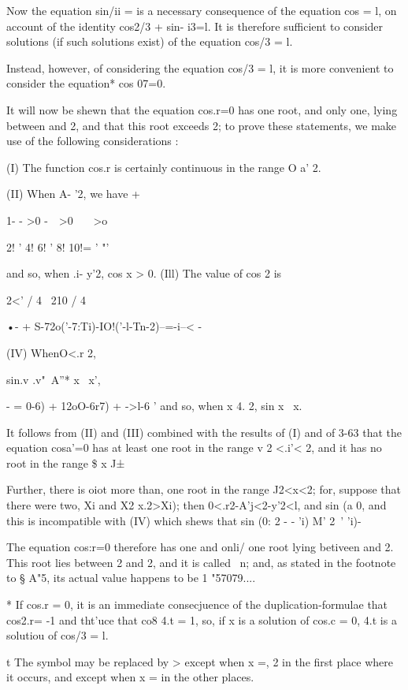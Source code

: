 Now the equation sin/ii = is a necessary consequence of the equation
cos = l, on account of the identity cos2/3 + sin- i3=l. It is
therefore sufficient to consider solutions (if such solutions exist)
of the equation cos/3 = l.

Instead, however, of considering the equation cos/3 = l, it is more
convenient to consider the equation* cos 07=0.

It will now be shewn that the equation cos.r=0 has one root, and only
one, lying between and 2, and that this root exceeds 2; to prove
these statements, we make use of the following considerations :

(I) The function cos.r is certainly continuous in the range O a' 2.

(II) When A- '2, we have +

1- - >0 -\ \ >0 \ \ \ >o

2! ' 4! 6! ' 8! 10!= ' "'

and so, when .i- y'2, cos x > 0. (Ill) The value of cos 2 is

2<' / 4 \ 210 / 4 \

•- + S-72o('-7:Ti)-IO!('-l-Tn-2)--=-i--< -

(IV) WhenO<.r 2,

sin.v .v"\ A''* x \, x',

- = 0-6) + 12oO-6r7) + ->l-6 ' and so, when x 4. 2, sin x \ x.

It follows from (II) and (III) combined with the results of (I) and of
3-63 that the equation cosa'=0 has at least one root in the range v 2
<.i'< 2, and it has no root in the range \$ x J±

Further, there is oiot more than, one root in the range J2<x<2; for,
suppose that there were two, Xi and X2 x.2>Xi); then
0<.r2-A'j<2-y'2<l, and sin (a%
0, and this is incompatible with (IV) which shews that sin (0: 2 - -
'i) M' 2~' 'i)-

The equation cos:r=0 therefore has one and onli/ one root lying
betiveen and 2. This root lies between 2 and 2, and it is called \ n;
and, as stated in the footnote to § A"5, its actual value happens to
be 1 "57079....

* If cos.r = 0, it is an immediate consecjuence of the
duplication-formulae that cos2.r= -1 and tht'uce that co8 4.t = 1, so,
if x is a solution of cos.c = 0, 4.t is a solutiou of cos/3 = l.

t The symbol may be replaced by > except when x =, 2 in the first
place where it occurs, and except when x = in the other places.



